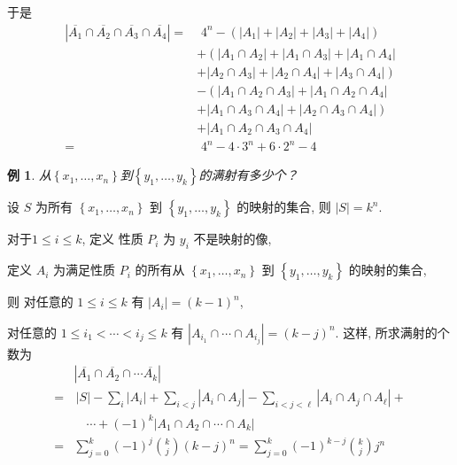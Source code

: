 \documentclass[punct]{ctexbeamer}
\newtheorem{ex}{例}
\def\sol{\noindent {\bf 解\ }}
\begin{document}
\begin{frame}
 于是
$$
\begin{aligned}
    \left|\overline{A_{1}} \cap \overline{A_{2}} \cap \overline{A_{3}} \cap \overline{A_{4}}\right|=& \, \, 4^{n}-\left(\left|A_{1}\right|+\left|A_{2}\right|+\left|A_{3}\right|+\left|A_{4}\right|\right) \\
    &+\left(\left|A_{1} \cap A_{2}\right|+\left|A_{1} \cap A_{3}\right|+\left|A_{1} \cap A_{4}\right|\right.\\
    &\left.+\left|A_{2} \cap A_{3}\right|+\left|A_{2} \cap A_{4}\right|+\left|A_{3} \cap A_{4}\right|\right) \\
    &-\left(\left|A_{1} \cap A_{2} \cap A_{3}\right|+\left|A_{1} \cap A_{2} \cap A_{4}\right|\right.\\
    &\left.+\left|A_{1} \cap A_{3} \cap A_{4}\right|+\left|A_{2} \cap A_{3} \cap A_{4}\right|\right) \\
    &+\left|A_{1} \cap A_{2} \cap A_{3} \cap A_{4}\right| \\
    =& \, \, 4^{n}-4 \cdot 3^{n}+6 \cdot 2^{n}-4
    \end{aligned}
$$
\end{frame}



\begin{frame}
    \begin{ex}
        从$\left\{x_{1},  \ldots, x_{n}\right\}$到$\left\{y_{1}, \ldots, y_{k}\right\}$的满射有多少个？
    \end{ex}
\pause
\sol 设 $S$ 为所有 $\left\{x_{1},  \ldots, x_{n}\right\}$ 到 $\left\{y_{1}, \ldots, y_{k}\right\}$ 的映射的集合, 则 $|S|=k^{n}$.

对于$1 \leq i \leq k$,  定义
性质 $P_{i}$ 为 $y_{i}$ 不是映射的像,

 定义 $A_{i}$ 为满足性质 $P_{i}$ 的所有从 $\left\{x_{1},  \ldots, x_{n}\right\}$ 到 $\left\{y_{1}, \ldots, y_{k}\right\}$ 的映射的集合,

则
对任意的 $1 \leq i \leq k$ 有 $\left|A_{i}\right|=(k-1)^{n}$,

对任意的 $1 \leq i_{1}<\cdots<i_{j} \leq k$ 有 $\left|A_{i_{1}} \cap \cdots \cap A_{i_{j}}\right|=(k-j)^{n}$.
\pause
这样, 所求满射的个数为
$$
\begin{aligned}
    &  \left|\overline{A_{1}} \cap \overline{A_{2}} \cap \cdots \overline{A_{k}}\right| \\
  = &\,  |S|-\sum_{i}\left|A_{i}\right|+\sum_{i<j}\left|A_{i} \cap A_{j}\right|-\sum_{i<j<\ell}\left|A_{i} \cap A_{j} \cap A_{\ell}\right|+\\
    & \quad   \cdots+(-1)^{k}\left|A_{1} \cap A_{2} \cap \cdots \cap A_{k}\right| \\
  = & \sum_{j=0}^{k}(-1)^{j}\binom{k}{j}(k-j)^{n} = \sum_{j=0}^{k}(-1)^{k-j}\binom{k}{j} j^{n}
\end{aligned}
$$
\end{frame}
\end{document}

